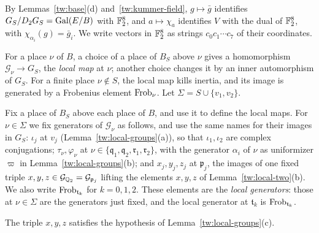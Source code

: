 By Lemmas~\ref{tw:base}(d) and~\ref{tw:kummer-field}, $g\mapsto\bar g$
identifies $G_S/D_2G_S=\operatorname{Gal}(E/B)$ with $\mathbb F_2^8$, and $a\mapsto\chi_a$
identifies $V$ with the dual of $\mathbb F_2^8$, with $\chi_{\alpha_i}(g)=\bar g_i$.
We write vectors in $\mathbb F_2^8$ as strings $c_0c_1\cdots c_7$ of their
coordinates.

For a place $\nu$ of $B$, a choice of a place of $B_S$ above $\nu$ gives a
homomorphism $\mathcal G_\nu\to G_S$, the \emph{local map} at $\nu$; another
choice changes it by an inner automorphism of $G_S$. For a finite
place $\nu\notin S$, the local map kills inertia, and its image is generated
by a Frobenius element $\operatorname{Frob}_\nu$. Let $\Sigma=S\cup\{v_1,v_2\}$.

\begin{definition}\label{tw:local-generators}
Fix a place of $B_S$ above each place of $B$, and use it to define the local
maps. For $\nu\in\Sigma$ we fix generators of $\mathcal G_\nu$ as follows,
and use the same names for their images in $G_S$: $\iota_j$ at $v_j$
(Lemma~\ref{tw:local-groups}(a)), so that $\iota_1,\iota_2$ are complex
conjugations; $\tau_\nu,\varphi_\nu$ at
$\nu\in\{\mathfrak q_1,\mathfrak q_2,\mathfrak r_1,\mathfrak r_2\}$, with the
generator $\alpha_i$ of $\nu$ as uniformizer $\varpi$ in
Lemma~\ref{tw:local-groups}(b); and $x_j,y_j,z_j$ at $\mathfrak p_j$, the
images of one fixed triple $x,y,z\in\mathcal G_{\mathbb Q_2}=\mathcal G_{\mathfrak p_j}$
lifting the elements $x,y,z$ of Lemma~\ref{tw:local-two}(b). We also write
$\operatorname{Frob}_{\mathfrak t_k}$ for $k=0,1,2$. These elements are the \emph{local
generators}: those at $\nu\in\Sigma$ are the generators just fixed, and the
local generator at $\mathfrak t_k$ is $\operatorname{Frob}_{\mathfrak t_k}$.
\end{definition}

The triple $x,y,z$ satisfies the hypothesis of
Lemma~\ref{tw:local-groups}(c).

